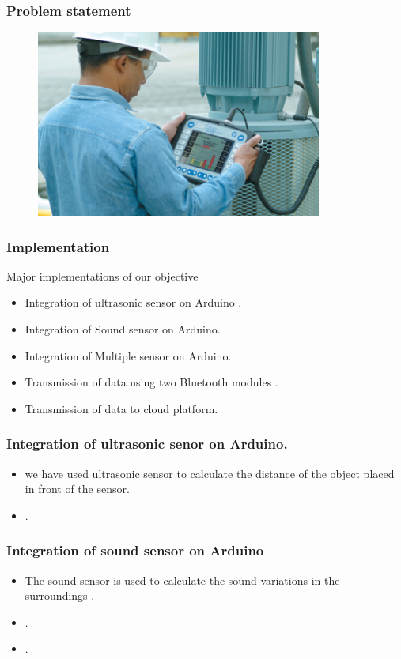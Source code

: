 \documentclass{beamer}
\begin{document}
\begin{frame}\frametitle{Problem statement}
\begin{figure}[h]
\centerline{\includegraphics[width=3.7in]{health}}
\end{figure}
\end{frame}
\begin{frame}\frametitle{Implementation}
\item Major implementations of our objective 
\begin{itemize}

\item Integration of ultrasonic sensor on Arduino .
\item Integration of Sound sensor on Arduino.
\item Integration of Multiple sensor on Arduino.
\item Transmission of data  using two  Bluetooth modules .
\item Transmission of data to cloud platform.

\end{itemize}
\end{frame}
\begin{frame}\frametitle{Integration of ultrasonic senor on Arduino.}
\begin{itemize}
\item we have used ultrasonic sensor to calculate the distance of the object placed in front of the sensor.
\item .
\end{itemize}
\end{frame}

\begin{frame}\frametitle{Integration of sound sensor on Arduino}
\begin{itemize}
\item The sound sensor is used to calculate the  sound variations in the  surroundings  .  
\item   .  
\item   .
\end{itemize}
\end{frame}
\end{document}

